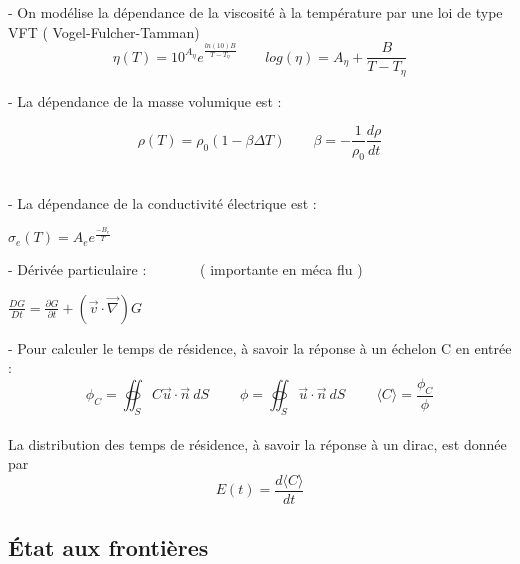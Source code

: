 \documentclass[12pt, a4paper, french, BCOR = 0pt, DIV = 10]{scrartcl}
\begin{document}
    - On modélise la dépendance de la viscosité à la température par une loi de type VFT ( Vogel-Fulcher-Tamman) \\ [0.5 cm]
    
    \centering
    $$
    \eta (T)  = 10^{A_{\eta}} e^{\frac{ln(10) B}{T-T_{\eta}}} ~~~~~~~~~ log(\eta) = A_{\eta} + \frac{B}{T-T_{\eta}}
    $$
    
    
    \raggedright
    - La dépendance de la masse volumique est : \\ [0.5 cm]
    \begin{center}
        
        
        $$
        \rho(T) = \rho_{0}  (1 - \beta \Delta T) ~~~~~~~~~ 
        \beta = -\frac{1}{\rho_{0}} \frac{d\rho}{dt}
        $$
        \\
    \end{center}
    
    
    
    - La dépendance de la conductivité électrique est : \\ [0.5 cm]
    \begin{center}
        $ 
        \sigma_{e} (T) =  A_{e} e^{\frac{-B_{e}}{T}}
        $
    \end{center}
    
    - Dérivée particulaire : ~~~~~~~( importante en méca flu )\\
    
    \begin{center}
        $ \frac{DG}{Dt}=\frac{\partial G}{\partial t} + (\vec {v} \cdot \vec {\nabla } ) G
        $ \\    
    \end{center}
    
    
    
    - Pour calculer le temps  de résidence, à savoir la réponse à un échelon C en entrée :\\ [0.5cm]
    $$
    \phi_{C} =  \oiint_S C\vec{u} \cdot \vec{n}~dS  ~~~~~~~~~~ \phi = \oiint_S \vec{u} \cdot \vec{n}~dS  ~~~~~~~~~~
    \langle C \rangle = \frac{\phi_{C}}{\phi}
    $$ 
    \\ [0.5 cm]
    La distribution des temps de résidence, à savoir la réponse à un dirac, est donnée par \[E(t)=\frac{d\langle C \rangle}{dt}\]
    
    \subsection{État aux frontières}
    
\end{document}
